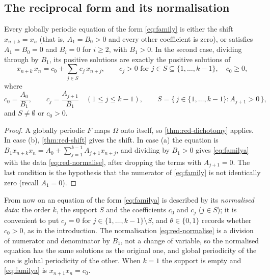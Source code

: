 \subsection{The reciprocal form and its normalisation}

\begin{theorem}[reduction]
\label{thm:reduction}
Every globally periodic equation of the form \eqref{eq:family} is either the
shift $x_{n+k}=x_n$ (that is, $A_1=B_0>0$ and every other coefficient is zero),
or satisfies $A_1=B_0=0$ and $B_i=0$ for $i\ge2$, with $B_1>0$. In the second
case, dividing through by $B_1$, its positive solutions are exactly the positive
solutions of
\begin{equation}
x_{n+k}\,x_n=c_0+\sum_{j\in S}c_j\,x_{n+j},
\qquad c_j>0 \text{ for } j\in S\subseteq\{1,\dots,k-1\},\quad c_0\ge0,
\label{eq:familya}
\end{equation}
where
\begin{equation}
c_0=\frac{A_0}{B_1},\qquad
c_j=\frac{A_{j+1}}{B_1}\quad(1\le j\le k-1),\qquad
S=\{\,j\in\{1,\dots,k-1\} : A_{j+1}>0\,\},
\label{eq:red-normalise}
\end{equation}
and $S\ne\emptyset$ or $c_0>0$.
\end{theorem}

\begin{proof}
A globally periodic $F$ maps $\Omega$ onto itself, so \autoref{thm:red-dichotomy}
applies. In case (b), \autoref{thm:red-shift} gives the shift. In case (a) the
equation is $B_1x_{n+k}x_n=A_0+\sum_{j=1}^{k-1}A_{j+1}x_{n+j}$, and dividing by
$B_1>0$ gives \eqref{eq:familya} with the data \eqref{eq:red-normalise}, after
dropping the terms with $A_{j+1}=0$. The last condition is the hypothesis that
the numerator of \eqref{eq:family} is not identically zero (recall $A_1=0$).
\end{proof}

From now on an equation of the form \eqref{eq:familya} is described by its
\textit{normalised data}: the order $k$, the support $S$ and the coefficients
$c_0$ and $c_j$ ($j\in S$); it is convenient to put $c_j=0$ for
$j\in\{1,\dots,k-1\}\setminus S$, and $\theta\in\{0,1\}$ records whether
$c_0>0$, as in the introduction. The
normalisation \eqref{eq:red-normalise} is a division of numerator and
denominator by $B_1$, not a change of variable, so the normalised equation has
the same solutions as the original one, and global periodicity of the one is
global periodicity of the other. When $k=1$ the support is empty and
\eqref{eq:familya} is $x_{n+1}x_n=c_0$.

